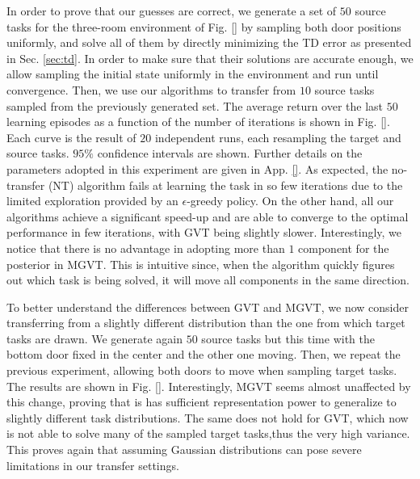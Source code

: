 \documentclass{article}
\begin{document}
In order to prove that our guesses are correct, we generate a set of $50$ source tasks for the three-room environment of Fig. \ref{} by sampling both door positions uniformly, and solve all of them by directly minimizing the TD error as presented in Sec. \ref{sec:td}. In order to make sure that their solutions are accurate enough, we allow sampling the initial state uniformly in the environment and run until convergence. Then, we use our algorithms to transfer from $10$ source tasks sampled from the previously generated set. The average return over the last $50$ learning episodes as a function of the number of iterations is shown in Fig. \ref{}. Each curve is the result of $20$ independent runs, each resampling the target and source tasks. $95\%$ confidence intervals are shown. Further details on the parameters adopted in this experiment are given in App. \ref{}. As expected, the no-transfer (NT) algorithm fails at learning the task in so few iterations due to the limited exploration provided by an $\epsilon$-greedy policy. On the other hand, all our algorithms achieve a significant speed-up and are able to converge to the optimal performance in few iterations, with GVT being slightly slower. Interestingly, we notice that there is no advantage in adopting more than $1$ component for the posterior in MGVT. This is intuitive since, when the algorithm quickly figures out which task is being solved, it will move all components in the same direction.

To better understand the differences between GVT and MGVT, we now consider transferring from a slightly different distribution than the one from which target tasks are drawn. We generate again $50$ source tasks but this time with the bottom door fixed in the center and the other one moving. Then, we repeat the previous experiment, allowing both doors to move when sampling target tasks. The results are shown in Fig. \ref{}. Interestingly, MGVT seems almost unaffected by this change, proving that is has sufficient representation power to generalize to slightly different task distributions. The same does not hold for GVT, which now is not able to solve many of the sampled target tasks,thus the very high variance. This proves again that assuming Gaussian distributions can pose severe limitations in our transfer settings.
\end{document}

